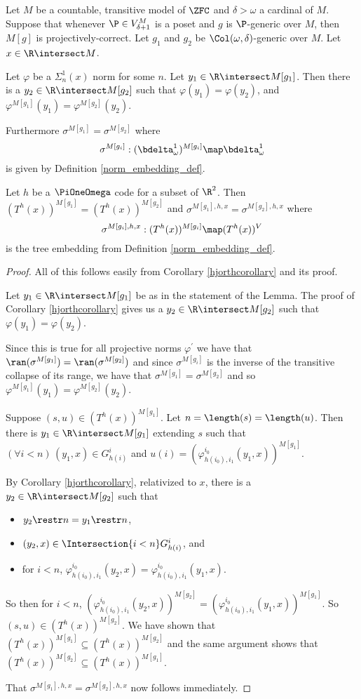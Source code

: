\documentclass[oneside,12pt]{amsart}
\begin{document}
\begin{lemma}
\label{applyhjorthcorollary}
Let $M$ be a countable, transitive model of $\ZFC$ and  $\delta>\omega$ a cardinal of $M$.
Suppose that whenever $\P\in V^M_{\delta+1}$ is a poset and $g$ is $\P$-generic over $M$, then
$M[g]$ is projectively-correct. Let $g_1$ and $g_2$ be $\Col(\omega, \delta)$-generic over $M$.
Let $x\in\R\intersect M$.

Let $\varphi$ be a $\Sigma^1_n(x)$ norm for some $n$.
Let $y_1\in\R\intersect M[g_1]$. Then there is a $y_2\in\R\intersect M[g_2]$ such
that $\varphi(y_1)=\varphi(y_2)$, and $\varphi^{M[g_1]}(y_1)=\varphi^{M[g_2]}(y_2)$.

Furthermore $\sigma^{M[g_1]} =\sigma^{M[g_2]}$ where
$$\sigma^{M[g_i]}:(\bdelta^1_{\omega})^{M[g_i]}\map \bdelta^1_{\omega}$$
is given by Definition \ref{norm_embedding_def}.

Let $h$ be a $\PiOneOmega$ code for a subset
of $\R^2$. Then $(T^h(x))^{M[g_1]}=(T^h(x))^{M[g_2]}$
and $\sigma^{M[g_1],h,x} = \sigma^{M[g_2],h,x}$ where
$$\sigma^{M[g_i],h,x}:(T^h(x))^{M[g_i]}\map(T^h(x))^V$$
is the tree embedding from
Definition \ref{norm_embedding_def}.
\end{lemma}
\begin{proof}
All of this follows easily from Corollary \ref{hjorthcorollary} and its proof.

Let $y_1\in\R\intersect M[g_1]$ be as in the statement of the Lemma. The proof of
Corollary \ref{hjorthcorollary} gives us a
$y_2\in\R\intersect M[g_2]$ such that $\varphi(y_1)=\varphi(y_2)$.

Since this is true for all projective norms $\varphi^{\prime}$
we have that
$\ran(\sigma^{M[g_1]})= \ran(\sigma^{M[g_2]})$
and since $\sigma^{M[g_i]}$ is the inverse of the transitive collapse of its range, we have that
$\sigma^{M[g_1]}=\sigma^{M[g_2]}$ and so $\varphi^{M[g_1]}(y_1)=\varphi^{M[g_2]}(y_2)$.


Suppose $(s,u)\in (T^h(x))^{M[g_1]}$. Let $n=\length(s)=\length(u)$. Then there is
$y_1\in\R\intersect M[g_1]$ extending $s$ such that $(\forall i<n)\, (y_1,x)\in G^{i}_{h(i)}$ and
$u(i)=(\varphi^{i_0}_{h(i_0),i_1}(y_1,x))^{M[g_1]}$.

By Corollary \ref{hjorthcorollary}, relativized to $x$, there is a $y_2\in\R\intersect M[g_2]$ such that
\begin{itemize}
\item $y_2 \restr n = y_1 \restr n$,
\item $(y_2,x)\in \Intersection{i<n} G^i_{h(i)}$, and
\item for $i<n$, $\varphi^{i_0}_{h(i_0),i_1}(y_2,x) = \varphi^{i_0}_{h(i_0),i_1}(y_1,x)$.
\end{itemize}

So then for $i<n$, $(\varphi^{i_0}_{h(i_0),i_1}(y_2,x))^{M[g_2]} =
(\varphi^{i_0}_{h(i_0),i_1}(y_1,x))^{M[g_1]}$.
So $(s,u)\in (T^h(x))^{M[g_2]}$. We have shown that $(T^h(x))^{M[g_1]}\subseteq(T^h(x))^{M[g_2]}$
and the same argument shows that
$(T^h(x))^{M[g_2]}\subseteq(T^h(x))^{M[g_1]}$.

That $\sigma^{M[g_1],h,x} = \sigma^{M[g_2],h,x}$ now follows immediately.
\end{proof}
\end{document}
